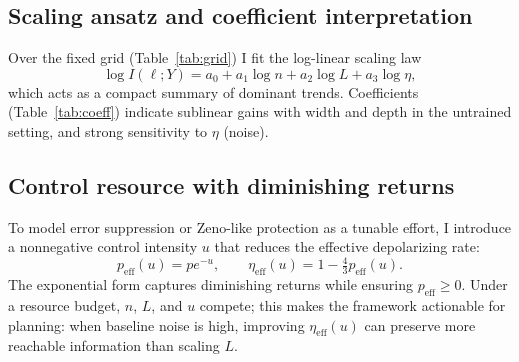 \documentclass[]{ieeeaccess}
\newcommand{\MI}{I(\ell;Y)}
\newcommand{\peff}{p_{\mathrm{eff}}(u)}
\newcommand{\etaeff}{\eta_{\mathrm{eff}}(u)}
\begin{document}
\subsection{Scaling ansatz and coefficient interpretation}
Over the fixed grid (Table~\ref{tab:grid}) I fit the log-linear scaling law
\begin{equation}
\log \MI = a_0 + a_1\log n + a_2\log L + a_3\log \eta,
\label{eq:scaling}
\end{equation}
which acts as a compact summary of dominant trends. Coefficients (Table~\ref{tab:coeff}) indicate sublinear gains with width and depth in the untrained setting, and strong sensitivity to $\eta$ (noise).

\subsection{Control resource with diminishing returns}
To model error suppression or Zeno-like protection \cite{ref17,ref18} as a tunable effort, I introduce a nonnegative control intensity $u$ that reduces the effective depolarizing rate:
\begin{equation}
\peff = p e^{-u},\qquad \etaeff = 1-\tfrac{4}{3}\peff.
\label{eq:control}
\end{equation}
The exponential form captures diminishing returns while ensuring $p_{\mathrm{eff}}\ge 0$. Under a resource budget, $n$, $L$, and $u$ compete; this makes the framework actionable for planning: when baseline noise is high, improving $\etaeff$ can preserve more reachable information than scaling $L$.
\end{document}
